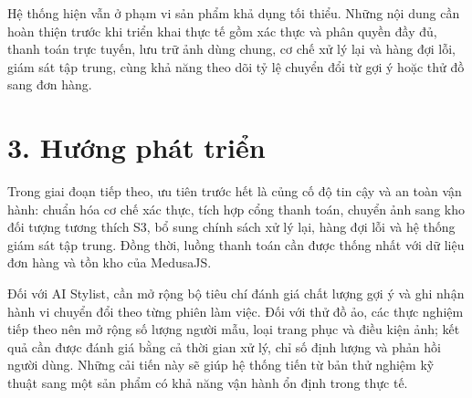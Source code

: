 \medskip

Hệ thống hiện vẫn ở phạm vi sản phẩm khả dụng tối thiểu. Những nội dung cần hoàn thiện trước khi triển khai thực tế gồm xác thực và phân quyền đầy đủ, thanh toán trực tuyến, lưu trữ ảnh dùng chung, cơ chế xử lý lại và hàng đợi lỗi, giám sát tập trung, cùng khả năng theo dõi tỷ lệ chuyển đổi từ gợi ý hoặc thử đồ sang đơn hàng.

\section*{3. Hướng phát triển}
{}

Trong giai đoạn tiếp theo, ưu tiên trước hết là củng cố độ tin cậy và an toàn vận hành: chuẩn hóa cơ chế xác thực, tích hợp cổng thanh toán, chuyển ảnh sang kho đối tượng tương thích S3, bổ sung chính sách xử lý lại, hàng đợi lỗi và hệ thống giám sát tập trung. Đồng thời, luồng thanh toán cần được thống nhất với dữ liệu đơn hàng và tồn kho của MedusaJS.

\medskip

Đối với AI Stylist, cần mở rộng bộ tiêu chí đánh giá chất lượng gợi ý và ghi nhận hành vi chuyển đổi theo từng phiên làm việc. Đối với thử đồ ảo, các thực nghiệm tiếp theo nên mở rộng số lượng người mẫu, loại trang phục và điều kiện ảnh; kết quả cần được đánh giá bằng cả thời gian xử lý, chỉ số định lượng và phản hồi người dùng. Những cải tiến này sẽ giúp hệ thống tiến từ bản thử nghiệm kỹ thuật sang một sản phẩm có khả năng vận hành ổn định trong thực tế.

\clearpage
